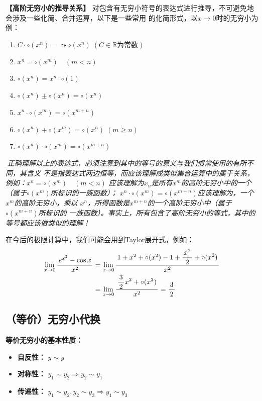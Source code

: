 \begin{shaded}
	{\bf 【高阶无穷小的推导关系】}
	对包含有无穷小符号的表达式进行推导，不可避免地会涉及一些化简、合并运算，以下是一些常用
	的化简形式，以$x\to 0$时的无穷小为例：
	\begin{enumerate}[(1)]
  	  \setlength{\itemindent}{1cm}
  	  \item $C\cdot\circ(x^n)=\leadsto\circ(x^n)\;(C\in\mathbb{R}\mbox{为常数})$
	  \item $x^n=\circ(x^m)\quad (m<n)$ 
	  \item $\circ(x^n)=x^n\cdot\circ(1)$
	  \item $\circ(x^n)\pm\circ(x^n)=\circ(x^n)$
	  \item $x^n\cdot\circ(x^m)=\circ(x^{m+n})$ 
	  \item $\circ(x^n)+\circ(x^m)=\circ(x^n)\;(m\geq n)$  
	  \item $\circ(x^n)\cdot\circ(x^m)=\circ(x^{m+n})$
	\end{enumerate}
	
	{\it\b 要正确理解以上的表达式，必须注意到其中的等号的意义与我们惯常使用的有所不同，其含义
	不是指表达式两边恒等，而应该理解成类似集合运算中的属于关系，例如：$x^n=\circ(x^m)\quad (m<n)$ 
	应该理解为$x_n$是所有$x^m$的高阶无穷小中的一个（属于$\circ(x^m)$所标识的一族函数）；
	$x^n\cdot\circ(x^m)=\circ(x^{m+n})$应该理解为，一个$x^m$的高阶无穷小，乘以
	$x^n$，所得函数是$x^{m+n}$的一个高阶无穷小中（属于$\circ(x^{m+n})$所标识的
	一族函数）。事实上，所有包含了高阶无穷小的等式，其中的等号都应该做类似的理解！}
	
	在今后的极限计算中，我们可能会用到Taylor展开式，例如：
	\begin{align}
		\lim\limits_{x\to{0}}\displaystyle\frac{\,{e^{x^2}-\cos x}\,}{\,{x^2}\,}&=\lim\limits_{x\to{0}}
		\displaystyle\frac{\,{1+x^2+\circ(x^2)-1+\displaystyle\frac{\,{x^2}\,}{\,{2}\,}+\circ(x^2)}\,}{\,{x^2}\,}\notag\\
		&=\lim\limits_{x\to{0}}\displaystyle\frac{\,{\displaystyle\frac{\,{3}\,}{\,{2}\,}x^2+\circ(x^2)}\,}{\,{x^2}\,}=\displaystyle\frac{\,{3}\,}{\,{2}\,}\notag
	\end{align}
\end{shaded}

\subsection{（等价）无穷小代换}

{\bf 等价无穷小的基本性质：}
\begin{itemize}
  \setlength{\itemindent}{1cm}
  \item {\bf 自反性：} $y\sim y$ 
  \item {\bf 对称性：} $y_1\sim y_2\Rightarrow y_2\sim y_1$ 
  \item {\bf 传递性：} $y_1\sim y_2,y_2\sim y_3\Rightarrow y_1\sim y_3$ 
\end{itemize}

